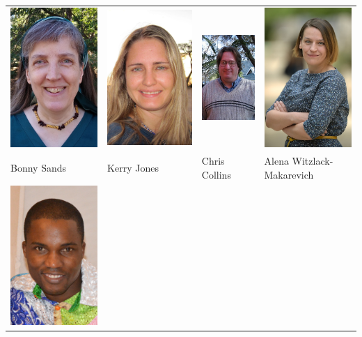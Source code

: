 \begin{tabular}{llll}
    \includegraphics[width=.2\textwidth]{bonny_s.jpg} &
    \includegraphics[width=.2\textwidth]{kerry_s.jpg} &
    \includegraphics[width=.2\textwidth]{chris_s.jpg} &
    \includegraphics[width=.2\textwidth]{alena_s.jpg} \\
    Bonny Sands & Kerry Jones & Chris Collins & Alena Witzlack-Makarevich \\
    \includegraphics[width=.2\textwidth]{sylvanus_s.png} &

\end{tabular}
